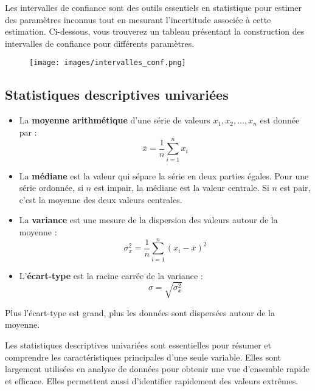 \documentclass[
  letterpaper,
  DIV=11,
  numbers=noendperiod]{scrartcl}
\begin{document}
Les intervalles de confiance sont des outils essentiels en statistique
pour estimer des paramètres inconnus tout en mesurant l'incertitude
associée à cette estimation. Ci-dessous, vous trouverez un tableau
présentant la construction des intervalles de confiance pour différents
paramètres.

\begin{figure}[H]
  \centering
  \texttt{[image: images/intervalles\_conf.png]}
\end{figure}

\subsection{Statistiques descriptives
univariées}\label{statistiques-descriptives-univariuxe9es}

\begin{itemize}
\item
  La \textbf{moyenne arithmétique} d'une série de valeurs
  \(x_1, x_2, \ldots, x_n\) est donnée par :
  \[\bar{x} = \frac{1}{n} \sum_{i=1}^{n} x_i\]
\item
  La \textbf{médiane} est la valeur qui sépare la série en deux parties
  égales. Pour une série ordonnée, si \(n\) est impair, la médiane est
  la valeur centrale. Si \(n\) est pair, c'est la moyenne des deux
  valeurs centrales.
\item
  La \textbf{variance} est une mesure de la dispersion des valeurs
  autour de la moyenne :
  \[\sigma_x^2 = \frac{1}{n} \sum_{i=1}^{n} (x_i - \bar{x})^2\]
\item
  L'\textbf{écart-type} est la racine carrée de la variance :
  \[\sigma = \sqrt{\sigma_x^2}\]
\end{itemize}

\begin{tcolorbox}[enhanced jigsaw, rightrule=.15mm, bottomrule=.15mm, opacitybacktitle=0.6, leftrule=.75mm, colbacktitle=quarto-callout-note-color!10!white, colback=white, opacityback=0, toprule=.15mm, left=2mm, title=\textcolor{quarto-callout-note-color}{\faInfo}\hspace{0.5em}{Note}, breakable, bottomtitle=1mm, colframe=quarto-callout-note-color-frame, toptitle=1mm, titlerule=0mm, coltitle=black, arc=.35mm]

Plus l'écart-type est grand, plus les données sont dispersées autour de
la moyenne.

\end{tcolorbox}

Les statistiques descriptives univariées sont essentielles pour résumer
et comprendre les caractéristiques principales d'une seule variable.
Elles sont largement utilisées en analyse de données pour obtenir une
vue d'ensemble rapide et efficace. Elles permettent aussi d'identifier
rapidement des valeurs extrêmes.
\end{document}
